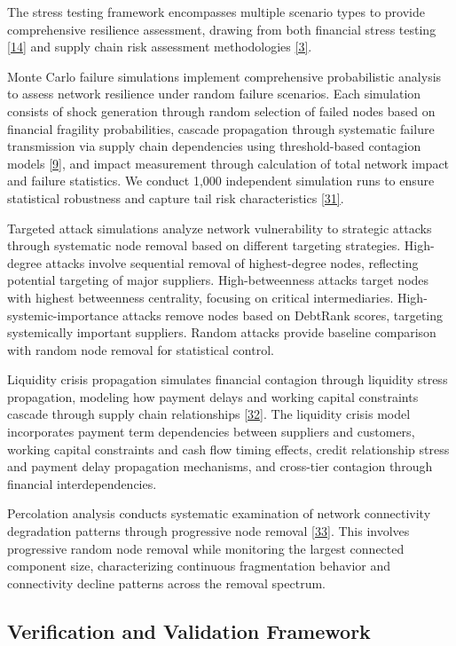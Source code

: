 \documentclass[a4 paper, 11pt,twoside]{article}
\newcommand{\0}{\Bf{0}}
\theoremstyle{definition}
\begin{document}
The stress testing framework encompasses multiple scenario types to provide comprehensive resilience assessment, drawing from both financial stress testing \hyperref[ref14]{[14]} and supply chain risk assessment methodologies \hyperref[ref3]{[3]}.

Monte Carlo failure simulations implement comprehensive probabilistic analysis to assess network resilience under random failure scenarios. Each simulation consists of shock generation through random selection of failed nodes based on financial fragility probabilities, cascade propagation through systematic failure transmission via supply chain dependencies using threshold-based contagion models \hyperref[ref9]{[9]}, and impact measurement through calculation of total network impact and failure statistics. We conduct 1,000 independent simulation runs to ensure statistical robustness and capture tail risk characteristics \hyperref[ref31]{[31]}.

Targeted attack simulations analyze network vulnerability to strategic attacks through systematic node removal based on different targeting strategies. High-degree attacks involve sequential removal of highest-degree nodes, reflecting potential targeting of major suppliers. High-betweenness attacks target nodes with highest betweenness centrality, focusing on critical intermediaries. High-systemic-importance attacks remove nodes based on DebtRank scores, targeting systemically important suppliers. Random attacks provide baseline comparison with random node removal for statistical control.

Liquidity crisis propagation simulates financial contagion through liquidity stress propagation, modeling how payment delays and working capital constraints cascade through supply chain relationships \hyperref[ref32]{[32]}. The liquidity crisis model incorporates payment term dependencies between suppliers and customers, working capital constraints and cash flow timing effects, credit relationship stress and payment delay propagation mechanisms, and cross-tier contagion through financial interdependencies.

Percolation analysis conducts systematic examination of network connectivity degradation patterns through progressive node removal \hyperref[ref33]{[33]}. This involves progressive random node removal while monitoring the largest connected component size, characterizing continuous fragmentation behavior and connectivity decline patterns across the removal spectrum.

\subsection{Verification and Validation Framework}
\end{document}
